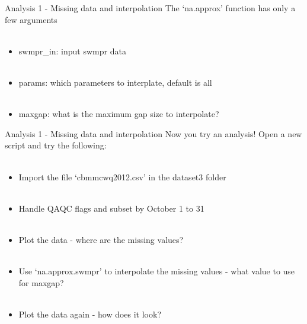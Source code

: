 \documentclass[xcolor=svgnames]{beamer}\usepackage[]{graphicx}\usepackage[]{color}
\begin{document}
\begin{frame}[containsverbatim]{Analysis 1 - Missing data and interpolation}
The `na.approx' function has only a few arguments\\~\\
\begin{itemize}
\item swmpr\_in: input swmpr data \\~\\
\item params: which parameters to interplate, default is all \\~\\
\item maxgap: what is the maximum gap size to interpolate?
\end{itemize}
\end{frame}

\begin{frame}[containsverbatim]{Analysis 1 - Missing data and interpolation}
Now you try an analysis! Open a new script and try the following: \\~\\
\begin{itemize}
\item Import the file `cbmmcwq2012.csv' in the dataset3 folder \\~\\
\item Handle QAQC flags and subset by October 1 to 31 \\~\\
\item Plot the data - where are the missing values?\\~\\
\item Use `na.approx.swmpr' to interpolate the missing values - what value to use for maxgap?\\~\\
\item Plot the data again - how does it look?
\end{itemize}
\end{frame}
\end{document}
